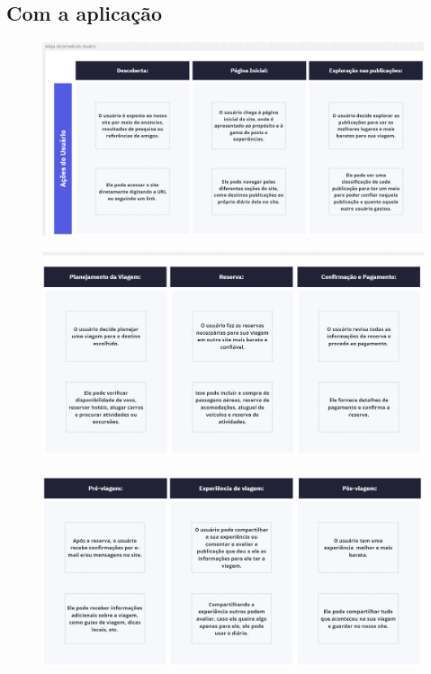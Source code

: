 \documentclass{article}
\begin{document}
\subsection{Com a aplicação}

\begin{figure}[H]
      \centering
      \includegraphics [width=1\textwidth]{IMGDOC/Mapa1.png}
      \label{mapa1}
\end{figure}
\begin{figure}[H]
      \centering
      \includegraphics [width=1\textwidth]{IMGDOC/Mapa2.png}
      \label{mapa2}
\end{figure}\begin{figure}[H]
      \centering
      \includegraphics [width=1\textwidth]{IMGDOC/Mapa3.png}
      \label{mapa3}
\end{figure}
\end{document}
